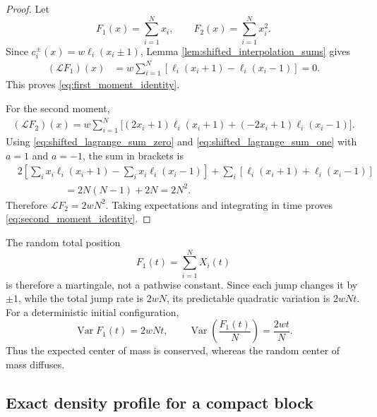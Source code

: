 \documentclass[11pt]{article}
\numberwithin{equation}{section}
\newcommand{\1}{\mathbf 1}
\begin{document}
\begin{proof}
Let
\[
    F_1(x)=\sum_{i=1}^Nx_i,
    \qquad
    F_2(x)=\sum_{i=1}^Nx_i^2.
\]
Since \(c_i^{\pm}(x)=w\ell_i(x_i\pm1)\), Lemma
\ref{lem:shifted_interpolation_sums} gives
\[
\begin{aligned}
    (\mathcal LF_1)(x)
    &=
    w\sum_{i=1}^N
    \left[\ell_i(x_i+1)-\ell_i(x_i-1)\right]
    =0.
\end{aligned}
\]
This proves \eqref{eq:first_moment_identity}.

For the second moment,
\[
\begin{aligned}
    (\mathcal LF_2)(x)
    =w\sum_{i=1}^N
    \bigl[
        (2x_i+1)\ell_i(x_i+1)
        +(-2x_i+1)\ell_i(x_i-1)
    \bigr].
\end{aligned}
\]
Using \eqref{eq:shifted_lagrange_sum_zero} and
\eqref{eq:shifted_lagrange_sum_one} with \(a=1\) and \(a=-1\), the sum in
brackets is
\[
\begin{aligned}
    &2\left[
      \sum_i x_i\ell_i(x_i+1)
      -\sum_i x_i\ell_i(x_i-1)
    \right]
    +\sum_i\left[\ell_i(x_i+1)+\ell_i(x_i-1)\right]
    \\
    &\hspace{2cm}
    =2N(N-1)+2N=2N^2.
\end{aligned}
\]
Therefore \(\mathcal LF_2=2wN^2\).  Taking expectations and integrating in
time proves \eqref{eq:second_moment_identity}.
\end{proof}

The random total position
\[
    F_1(t)=\sum_{i=1}^NX_i(t)
\]
is therefore a martingale, not a pathwise constant.  Since each jump changes it
by \(\pm1\), while the total jump rate is \(2wN\), its predictable quadratic
variation is \(2wNt\).  For a deterministic initial configuration,
\begin{equation}
    \operatorname{Var}F_1(t)=2wNt,
    \qquad
    \operatorname{Var}\left(\frac{F_1(t)}{N}\right)=\frac{2wt}{N}.
    \label{eq:center_of_mass_variance}
\end{equation}
Thus the expected center of mass is conserved, whereas the random center of
mass diffuses.



\subsection{Exact density profile for a compact block}
\label{sec:finite_block_melting}
\end{document}
